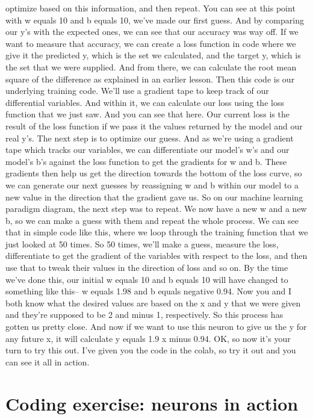 optimize based on this information, and then repeat.
You can see at this point with w equals 10 and b equals 10,
we've made our first guess.
And by comparing our y's with the expected ones,
we can see that our accuracy was way off.
If we want to measure that accuracy, we can create a loss function in code
where we give it the predicted y, which is the set we calculated,
and the target y, which is the set that we were supplied.
And from there, we can calculate the root mean square of the difference
as explained in an earlier lesson.
Then this code is our underlying training code.
We'll use a gradient tape to keep track of our differential variables.
And within it, we can calculate our loss using the loss function
that we just saw.
And you can see that here.
Our current loss is the result of the loss function if we pass it the values
returned by the model and our real y's.
The next step is to optimize our guess.
And as we're using a gradient tape which tracks our variables,
we can differentiate our model's w's and our model's
b's against the loss function to get the gradients for w and b.
These gradients then help us get the direction
towards the bottom of the loss curve, so we can generate our next guesses
by reassigning w and b within our model to a new value in the direction
that the gradient gave us.
So on our machine learning paradigm diagram, the next step was to repeat.
We now have a new w and a new b, so we can make a guess with them
and repeat the whole process.
We can see that in simple code like this,
where we loop through the training function
that we just looked at 50 times.
So 50 times, we'll make a guess, measure the loss,
differentiate to get the gradient of the variables with respect to the loss,
and then use that to tweak their values in the direction of loss and so on.
By the time we've done this, our initial w
equals 10 and b equals 10 will have changed to something like this--
w equals 1.98 and b equals negative 0.94.
Now you and I both know what the desired values are based on the x and y
that we were given and they're supposed to be 2 and minus 1, respectively.
So this process has gotten us pretty close.
And now if we want to use this neuron to give us the y for any future x,
it will calculate y equals 1.9 x minus 0.94.
OK, so now it's your turn to try this out.
I've given you the code in the colab, so try it out
and you can see it all in action.

\section{Coding exercise: neurons in action}

